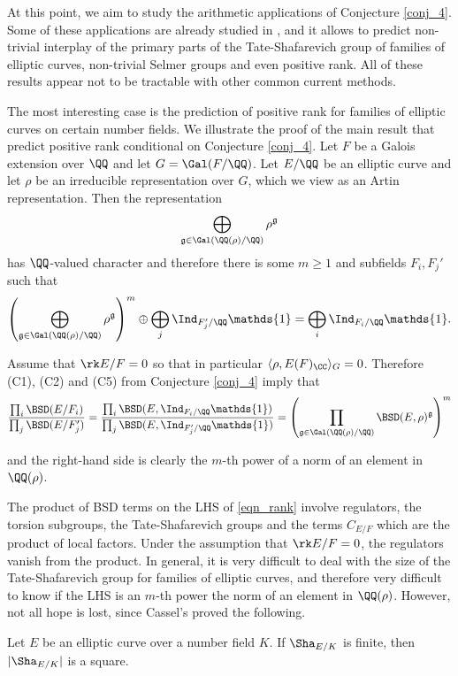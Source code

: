 At this point, we aim to study the arithmetic applications of Conjecture \ref*{conj_4}. Some of these applications are already studied in \cite[\S 3]{DEW1}, and it allows to predict non-trivial interplay of the primary parts of the Tate-Shafarevich group of families of elliptic curves, non-trivial Selmer groups and even positive rank. All of these results appear not to be tractable with other common current methods.

The most interesting case is the prediction of positive rank for families of elliptic curves on certain number fields. We illustrate the proof of the main result that predict positive rank conditional on Conjecture \ref*{conj_4}. Let $F$ be a Galois extension over $\QQ$ and let $G=\Gal(F/\QQ)$. Let $E/\QQ$ be an elliptic curve and let $\rho$ be an irreducible representation over $G$, which we view as an Artin representation. Then the representation 
$$\bigoplus_{\mathfrak{g}\in\Gal(\QQ(\rho)/\QQ)}\rho^{\mathfrak{g}}$$
has $\QQ$-valued character and therefore there is some $m\geq 1$ and subfields $F_i, F_j'$ such that 
$$\left(\bigoplus_{\mathfrak{g}\in\Gal(\QQ(\rho)/\QQ)}\rho^{\mathfrak{g}}\right)^m\oplus\bigoplus_j\Ind_{F'_j/\QQ}\mathds{1}=\bigoplus_i\Ind_{F_i/\QQ}\mathds{1}.$$

Assume that $\rk E/F=0$ so that in particular $\langle \rho, E(F)_\CC\rangle_G=0$. Therefore (C1), (C2) and (C5) from Conjecture \ref*{conj_4} imply that 
\begin{equation}\label{eqn_rank}
    \frac{\prod_i\BSD(E/F_i)}{\prod_j\BSD(E/F'_j)}=\frac{\prod_i\BSD(E,\Ind_{F_i/\QQ}\mathds{1})}{\prod_j\BSD(E, \Ind_{F'_j/\QQ}\mathds{1})}=\left(\prod_{\mathfrak{g}\in\Gal(\QQ(\rho)/\QQ)}\BSD(E,\rho)^{\mathfrak{g}}\right)^m
\end{equation}

and the right-hand side is clearly the $m$-th power of a norm of an element in $\QQ(\rho)$. 

The product of BSD terms on the LHS of \eqref{eqn_rank} involve regulators, the torsion subgroups, the Tate-Shafarevich groups and the terms $C_{E/F}$ which are the product of local factors. Under the assumption that $\rk E/F=0$, the regulators vanish from the product. In general, it is very difficult to deal with the size of the Tate-Shafarevich group for families of elliptic curves, and therefore very difficult to know if the LHS is an $m$-th power the norm of an element in $\QQ(\rho)$. However, not all hope is lost, since Cassel's proved the following.

\begin{thm}
    Let $E$ be an elliptic curve over a number field $K$. If $\Sha_{E/K}$ is finite, then $|\Sha_{E/K}|$ is a square.
\end{thm}


